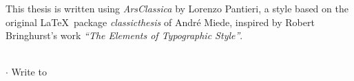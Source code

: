 
\clearpage
{}
\thispagestyle{empty}

\hfill

\vfill


This thesis is written using \textit{ArsClassica} by Lorenzo Pantieri, a style
based on the original \LaTeX~package \textit{classicthesis} of André Miede,
inspired by Robert Bringhurst’s work \textit{“The Elements of Typographic
Style”}.
\newline


\noindent{}\rmfamily\\
\leftpointright	 \href{mailto:\myEmail}{\myEmail}
$\cdot$ Write to \myName
